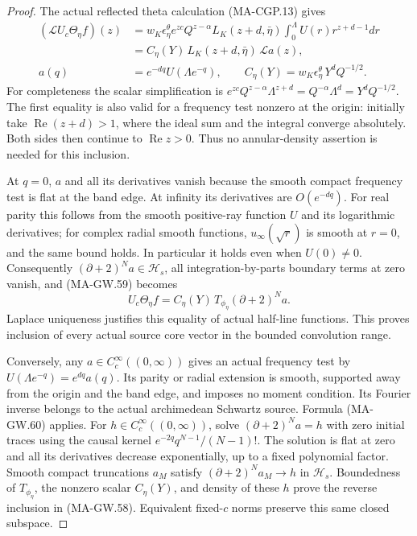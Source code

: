 \begin{proof}
The actual reflected theta calculation (MA-CGP.13) gives
\[
 \begin{aligned}
 (\mathcal L U_c\Theta_\eta f)(z)
  &=w_K\epsilon_\eta^\theta e^{zc}Q^{z-\alpha}
       L_K(z+d,\bar\eta)\int_0^\Lambda U(r)r^{z+d-1}dr\\
  &=C_\eta(Y)\,L_K(z+d,\bar\eta)\,\mathcal La(z),\\
 a(q)&=e^{-dq}U(\Lambda e^{-q}),\qquad
 C_\eta(Y)=w_K\epsilon_\eta^\theta\,Y^dQ^{-1/2}.
 \end{aligned}
 \tag{MA-GW.59}
\]
For completeness the scalar simplification is
\(e^{zc}Q^{z-\alpha}\Lambda^{z+d}
=Q^{-\alpha}\Lambda^d=Y^dQ^{-1/2}\).
The first equality is also valid for a frequency test
nonzero at the origin: initially take \(\operatorname{Re}(z+d)>1\),
where the ideal sum and the integral converge absolutely.
Both sides then continue to \(\operatorname{Re}z>0\).
Thus no annular-density assertion is needed for this inclusion.

At \(q=0\), \(a\) and all its derivatives vanish because
the smooth compact frequency test is flat at the band edge.
At infinity its derivatives are \(O(e^{-dq})\).
For real parity this follows from the smooth positive-ray
function \(U\) and its logarithmic derivatives; for complex
radial smooth functions, \(u_\infty(\sqrt r)\) is smooth at
\(r=0\), and the same bound holds.  In particular it holds
even when \(U(0)\ne0\).
Consequently \((\partial+2)^Na\in\mathcal H_s\), all
integration-by-parts boundary terms at zero vanish, and
(MA-GW.59) becomes
\[
 U_c\Theta_\eta f
           =C_\eta(Y)\,T_{\phi_\eta}(\partial+2)^Na.
 \tag{MA-GW.60}
\]
Laplace uniqueness justifies this equality of actual
half-line functions.  This proves inclusion of every
actual source core vector in the bounded convolution range.

Conversely, any \(a\in C_c^\infty((0,\infty))\) gives an
actual frequency test by
\(U(\Lambda e^{-q})=e^{dq}a(q)\).
Its parity or radial extension is smooth, supported away
from the origin and the band edge, and imposes no moment
condition.  Its Fourier inverse belongs to the actual
archimedean Schwartz source.  Formula (MA-GW.60) applies.
For \(h\in C_c^\infty((0,\infty))\), solve
\((\partial+2)^Na=h\) with zero initial traces using the
causal kernel \(e^{-2q}q^{N-1}/(N-1)!\).
The solution is flat at zero and all its derivatives
decrease exponentially, up to a fixed polynomial factor.
Smooth compact truncations \(a_M\) satisfy
\((\partial+2)^Na_M\to h\) in \(\mathcal H_s\).
Boundedness of \(T_{\phi_\eta}\), the nonzero scalar
\(C_\eta(Y)\), and density of these \(h\) prove the reverse
inclusion in (MA-GW.58).  Equivalent fixed-\(c\) norms
preserve this same closed subspace.


\end{proof}
